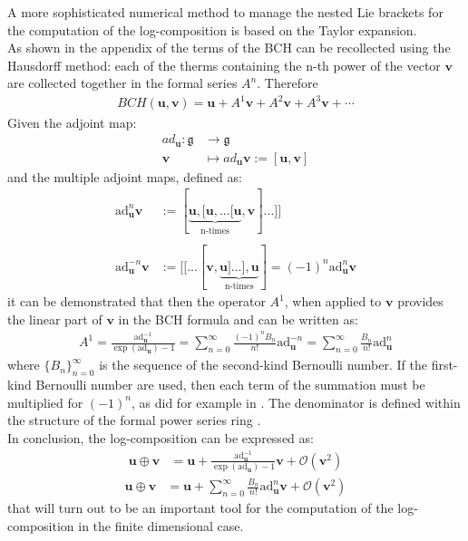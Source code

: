 A more sophisticated numerical method to manage the nested Lie brackets for the computation of the log-composition is based on the Taylor expansion. \\
As shown in the appendix of \cite{klarsfeld1989baker} the terms of the BCH can be recollected using the Hausdorff method: each of the therms containing the n-th power of the vector $\mathbf{v}$ are collected together in the formal series $A^{n}$. Therefore
\begin{align*}
BCH(\mathbf{u},\mathbf{v}) 
= 
\mathbf{u} + A^{1} \mathbf{v} + A^{2} \mathbf{v} + A^{3} \mathbf{v} + \cdots
\end{align*}
Given the adjoint map:
\begin{align*}
ad_{\mathbf{u}} : \mathfrak{g}  & \longrightarrow \mathfrak{g}  
\\
\mathbf{v} &\longmapsto ad_{\mathbf{u}}   \mathbf{v} :=  [\mathbf{u}, \mathbf{v}]
\end{align*}
and the multiple adjoint maps, defined as:
\begin{align*}
\text{ad}_{\mathbf{u}}^{n} \mathbf{v} 
&:= [  \underbrace{   \mathbf{u},[\mathbf{u},... [\mathbf{u}}_{\text{n-times}},\mathbf{v}]...]] 
\\
\\
\text{ad}_{\mathbf{u}}^{-n} \mathbf{v} 
&:= [[...[  \mathbf{v}, \underbrace{   \mathbf{u}]...],\mathbf{u}}_{\text{n-times}}]
= (-1)^n \text{ad}_{\mathbf{u}}^{n} \mathbf{v} 
\end{align*}
it can be demonstrated that then the operator $A^{1}$, when applied to $\mathbf{v}$ provides the linear part of $\mathbf{v}$ in the BCH formula and can be written as:
\begin{align*}
A^{1}
= 
\frac{  
	\text{ad}_{\mathbf{u}}^{-1} 
	}{
	\exp{(\text{ad}_{\mathbf{u}})}-1
	}
=
\sum_{n=0}^{\infty} \frac{(-1)^nB_{n}}{n!} \text{ad}_{\mathbf{u}}^{ - n} 
=
\sum_{n=0}^{\infty} \frac{B_{n}}{n!} \text{ad}_{\mathbf{u}}^{ n} 
\end{align*}
where $\lbrace B_{n} \rbrace_{n=0}^{\infty} $ is the sequence of the second-kind Bernoulli number. If the first-kind Bernoulli number are used, then each term of the summation must be multiplied for $(-1)^{n}$, as did for example in \cite{klarsfeld1989baker}. The denominator is defined within the structure of the formal power series ring \cite{mariconda2013calcolo}.\\
In conclusion, the log-composition can be expressed as:
\begin{align*}
\mathbf{u}\oplus \mathbf{v}  
&= 
\mathbf{u} + 
\frac{  
	\text{ad}_{\mathbf{u}}^{-1} 
}{
\exp{(\text{ad}_{\mathbf{u}})}-1
} \mathbf{v}  
+ 
\mathcal{O}(\mathbf{v} ^2) 
\end{align*}
\begin{align}\label{eq:taylor}
\mathbf{u}\oplus \mathbf{v}  
&=
\mathbf{u} 
+
\sum_{n=0}^{\infty} \frac{B_{n}}{n!} \text{ad}_{\mathbf{u}}^{ n} 
\mathbf{v}  
+
\mathcal{O}(\mathbf{v} ^2)
\end{align}
that will turn out to be an important tool for the computation of the log-composition in the finite dimensional case. 

